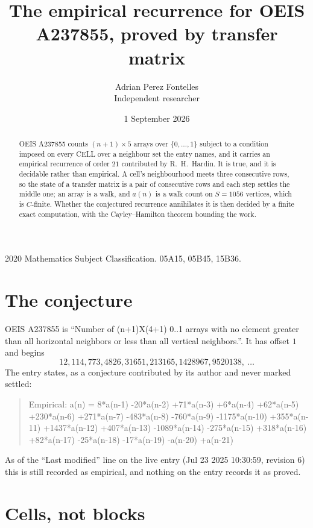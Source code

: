 \documentclass[11pt,a4paper]{article}
\title{The empirical recurrence for OEIS A237855, proved by transfer matrix}
\author{Adrian Perez Fontelles\\ \small Independent researcher}
\date{1 September 2026}
\theoremstyle{plain}
\theoremstyle{definition}
\begin{document}
\maketitle

\begin{abstract}
OEIS A237855 counts $(n+1)\times5$ arrays over $\{0,\dots,1\}$ subject to a condition imposed on
every CELL over a neighbour set the entry names, and it carries an empirical recurrence of
order $21$ contributed by R.~H.~Hardin. It is true, and it is decidable rather than
empirical. A cell's neighbourhood meets three consecutive rows, so the state of a transfer
matrix is a pair of consecutive rows and each step settles the middle one; an array is a
walk, and $a(n)$ is a walk count on $S=1056$ vertices, which is $C$-finite. Whether the
conjectured recurrence annihilates it is then decided by a finite exact computation, with the
Cayley--Hamilton theorem bounding the work.
\end{abstract}

\noindent\small 2020 Mathematics Subject Classification. 05A15, 05B45, 15B36.\normalsize

\section{The conjecture}

OEIS A237855 is ``Number of (n+1)X(4+1) 0..1 arrays with no element greater than all horizontal neighbors or less than all vertical neighbors.''. It has offset $1$ and begins
\[
12, 114, 773, 4826, 31651, 213165, 1428967, 9520138,\ \dots
\]
The entry states, as a conjecture contributed by its author and never marked settled:
\begin{quote}
Empirical: a(n) = 8*a(n-1) -20*a(n-2) +71*a(n-3) +6*a(n-4) +62*a(n-5) +230*a(n-6) +271*a(n-7) -483*a(n-8) -760*a(n-9) -1175*a(n-10) +355*a(n-11) +1437*a(n-12) +407*a(n-13) -1089*a(n-14) -275*a(n-15) +318*a(n-16) +82*a(n-17) -25*a(n-18) -17*a(n-19) -a(n-20) +a(n-21)
\end{quote}
As of the ``Last modified'' line on the live entry (Jul 23 2025 10:30:59, revision 6) this is still
recorded as empirical, and nothing on the entry records it as proved.

\section{Cells, not blocks}
\end{document}
